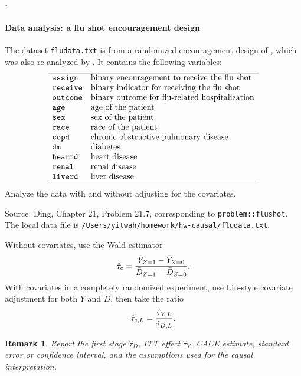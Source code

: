 \documentclass[krantz1]{krantz}
\newcommand{\ri}[1]{\lstinline{#1}}
\newenvironment{mysolution}[1]{\vspace{0.1in} \noindent {\bfseries Solution to Problem {#1}:}}{\hfill$\square$}
\newtheorem{remark}{Remark}
\def\cp{\textup{c}}
\begin{document}
\begin{mysolution}{21.6}

\end{mysolution}

\paragraph{Data analysis: a flu shot encouragement design}\label{problem::flushot-hw}

The dataset \ri{fludata.txt} is from a randomized encouragement design of
\citet{mcdonald1992effects}, which was also re-analyzed by
\citet{hirano2000assessing}. It contains the following variables:
\[
\begin{array}{ll}
\hline
\texttt{assign} & \text{binary encouragement to receive the flu shot}\\
\texttt{receive} & \text{binary indicator for receiving the flu shot}\\
\texttt{outcome} & \text{binary outcome for flu-related hospitalization}\\
\texttt{age} & \text{age of the patient}\\
\texttt{sex} & \text{sex of the patient}\\
\texttt{race} & \text{race of the patient}\\
\texttt{copd} & \text{chronic obstructive pulmonary disease}\\
\texttt{dm} & \text{diabetes}\\
\texttt{heartd} & \text{heart disease}\\
\texttt{renal} & \text{renal disease}\\
\texttt{liverd} & \text{liver disease}\\
\hline
\end{array}
\]
Analyze the data with and without adjusting for the covariates.

Source: Ding, Chapter 21, Problem 21.7, corresponding to
\ri{problem::flushot}. The local data file is
\ri{/Users/yitwah/homework/hw-causal/fludata.txt}.

Without covariates, use the Wald estimator
\[
\hat\tau_\cp
=
\frac{\bar Y_{Z=1}-\bar Y_{Z=0}}
{\bar D_{Z=1}-\bar D_{Z=0}}.
\]
With covariates in a completely randomized experiment, use Lin-style covariate
adjustment for both \(Y\) and \(D\), then take the ratio
\[
\hat\tau_{\cp,L}
=
\frac{\hat\tau_{Y,L}}{\hat\tau_{D,L}}.
\]

\begin{remark}
Report the first stage \(\hat\tau_D\), ITT effect \(\hat\tau_Y\), CACE estimate,
standard error or confidence interval, and the assumptions used for the causal
interpretation.
\end{remark}
\end{document}
